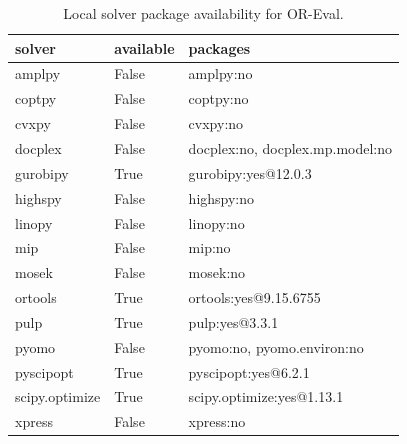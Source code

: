 \begin{table}[t]
\centering
\small
\begin{tabular}{lll}
\toprule
solver & available & packages \\
\midrule
amplpy & False & amplpy:no \\
coptpy & False & coptpy:no \\
cvxpy & False & cvxpy:no \\
docplex & False & docplex:no, docplex.mp.model:no \\
gurobipy & True & gurobipy:yes@12.0.3 \\
highspy & False & highspy:no \\
linopy & False & linopy:no \\
mip & False & mip:no \\
mosek & False & mosek:no \\
ortools & True & ortools:yes@9.15.6755 \\
pulp & True & pulp:yes@3.3.1 \\
pyomo & False & pyomo:no, pyomo.environ:no \\
pyscipopt & True & pyscipopt:yes@6.2.1 \\
scipy.optimize & True & scipy.optimize:yes@1.13.1 \\
xpress & False & xpress:no \\
\bottomrule
\end{tabular}
\caption{Local solver package availability for OR-Eval.}
\label{tab:or_eval_solver_availability}
\end{table}

